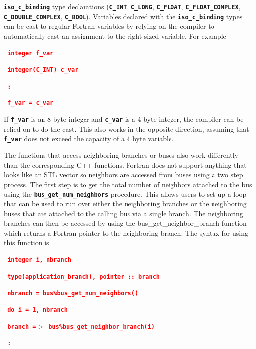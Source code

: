 \documentclass[12pt]{report} %
\begin{document}
 \texttt{\textbf{iso\_c\_binding}} type declarations (\texttt{\textbf{C\_INT}}, \texttt{\textbf{C\_LONG}}, \texttt{\textbf{C\_FLOAT}}, \texttt{\textbf{C\_FLOAT\_COMPLEX}}, \texttt{\textbf{C\_DOUBLE\_COMPLEX}}, \texttt{\textbf{C\_BOOL}}). Variables declared with the \texttt{\textbf{iso\_c\_binding}} types can be cast to regular Fortran variables by relying on the compiler to automatically cast an assignment to the right sized variable. For example

\textcolor{red}{\texttt{\textbf{  integer f\_var}}}

\textcolor{red}{\texttt{\textbf{  integer(C\_INT) c\_var}}}

\textcolor{red}{\texttt{\textbf{     :}}}

\textcolor{red}{\texttt{\textbf{  f\_var = c\_var}}}

If \texttt{\textbf{f\_var}} is an 8 byte integer and \texttt{\textbf{c\_var}} is a 4 byte integer, the compiler can be relied on to do the cast. This also works in the opposite direction, assuming that \texttt{\textbf{f\_var}} does not exceed the capacity of a 4 byte variable.

The functions that access neighboring branches or buses also work differently than the corresponding C++ functions. Fortran does not support anything that looks like an STL vector so neighbors are accessed from buses using a two step process. The first step is to get the total number of neighbors attached to the bus using the \texttt{\textbf{bus\_get\_num\_neighbors}} procedure. This allows users to set up a loop that can be used to run over either the neighboring branches or the neighboring buses that are attached to the calling bus via a single branch. The neighboring branches can then be accessed by using the bus\_get\_neighbor\_branch function which returns a Fortran pointer to the neighboring branch. The syntax for using this function is

\textcolor{red}{\texttt{\textbf{  integer i, nbranch}}}

\textcolor{red}{\texttt{\textbf{  type(application\_branch), pointer :: branch}}}

\textcolor{red}{\texttt{\textbf{  nbranch = bus\%bus\_get\_num\_neighbors()}}}

\textcolor{red}{\texttt{\textbf{  do i = 1, nbranch}}}

\textcolor{red}{\texttt{\textbf{    branch =$\boldsymbol{\mathrm{>}}$ bus\%bus\_get\_neighbor\_branch(i)}}}

\textcolor{red}{\texttt{\textbf{       :}}}
\end{document}
